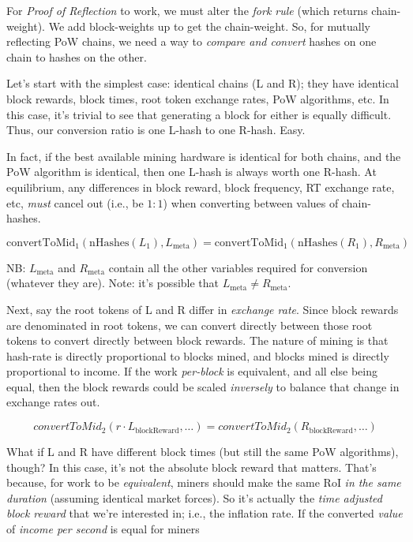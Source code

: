 
For \emph{Proof of Reflection} to work, we must alter the \emph{fork rule} (which returns chain-weight).
We add block-weights up to get the chain-weight.
So, for mutually reflecting PoW chains, we need a way to \emph{compare and convert} hashes on one chain to hashes on the other.

Let's start with the simplest case: identical chains (L and R); they have identical block rewards, block times, root token exchange rates, PoW algorithms, etc.
In this case, it's trivial to see that generating a block for either is equally difficult.
Thus, our conversion ratio is one L-hash to one R-hash. Easy.

In fact, if the best available mining hardware is identical for both chains, and the PoW algorithm is identical, then one L-hash is always worth one R-hash.
At equilibrium, any differences in block reward, block frequency, RT exchange rate, etc, \emph{must} cancel out (i.e., be $1:1$) when converting between values of chain-hashes.

$$
\text{convertToMid}_1(\text{nHashes}(L_1), L_{\text{meta}}) = \text{convertToMid}_1(\text{nHashes}(R_1), R_{\text{meta}})
$$

NB: $L_\text{meta}$ and $R_\text{meta}$ contain all the other variables required for conversion (whatever they are). Note: it's possible that $L_\text{meta} \ne R_\text{meta}$.

Next, say the root tokens of L and R differ in \emph{exchange rate}.
Since block rewards are denominated in root tokens, we can convert directly between those root tokens to convert directly between block rewards.
The nature of mining is that hash-rate is directly proportional to blocks mined, and blocks mined is directly proportional to income.
If the work \emph{per-block} is equivalent, and all else being equal, then the block rewards could be scaled \emph{inversely} to balance that change in exchange rates out.

$$
convertToMid_2(r\cdot L_\text{blockReward}, \dots) = convertToMid_2(R_\text{blockReward}, \dots)
$$

What if L and R have different block times (but still the same PoW algorithms), though?
In this case, it's not the absolute block reward that matters.
That's because, for work to be \emph{equivalent}, miners should make the same RoI \emph{in the same duration} (assuming identical market forces).
So it's actually the \emph{time adjusted block reward} that we're interested in; i.e., the inflation rate.
If the converted \emph{value} of \emph{income per second} is equal for miners
